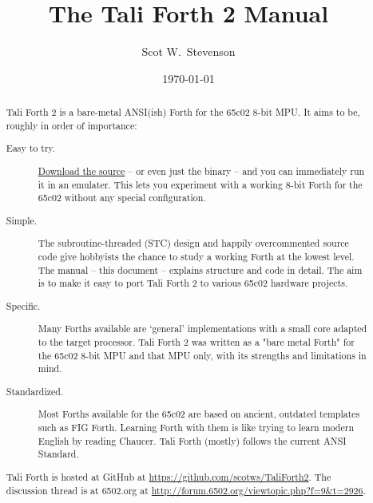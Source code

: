 \documentclass[a4paper,notitlepage]{report}
\title{The Tali Forth 2 Manual}
\author{Scot W.~Stevenson}
\date{\today}
\begin{document}
\maketitle

\begin{abstract}
        Tali Forth 2 is a bare-metal ANSI(ish) Forth for the 65c02 8-bit MPU. 
        It aims to be, roughly in order of importance: 

        \begin{description}

        \item [Easy to try.]
                \href{https://github.com/scotws/TaliForth2}{Download the source}
                -- or even just the binary -- and you can immediately
                run it in an emulater. This lets you experiment with a
                working 8-bit Forth for the 65c02 without any special
                configuration.

        \item [Simple.] The subroutine-threaded (STC) design and happily
                overcommented source code give hobbyists the chance to study a
                working Forth at the lowest level. The manual -- this
                document -- explains structure and code in detail. The aim
                is to make it easy to port Tali Forth 2
                to various 65c02 hardware projects.

        \item [Specific.] Many Forths available are `general' implementations with
                a small core adapted to the target processor. Tali Forth 2 was
                written as a "bare metal Forth" for the 65c02 8-bit MPU
                and that MPU only, with its strengths and limitations in
                mind.

        \item [Standardized.] Most Forths available for the 65c02 are based on ancient,
                outdated templates such as FIG Forth. Learning Forth with them is like
                trying to learn modern English by reading Chaucer. Tali
                Forth (mostly) follows the current ANSI Standard.
\end{description}

        Tali Forth is hosted at GitHub at
        \href{https://github.com/scotws/TaliForth2}{https://github.com/scotws/TaliForth2}. 
        The discussion thread is at 6502.org at
        \href{http://forum.6502.org/viewtopic.php?f=9\&t=2926}{http://forum.6502.org/viewtopic.php?f=9\&t=2926}.
        
\end{abstract}
\end{document}
